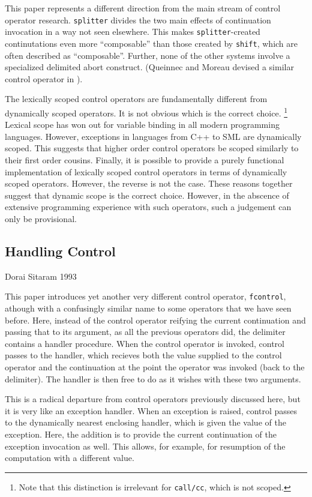 \documentclass[12pt]{article}
\begin{document}
This paper represents a different direction from the main stream of
control operator research.  {\tt splitter} divides the two main
effects of continuation invocation in a way not seen elsewhere.  This
makes {\tt splitter}-created continutations even more ``composable''
than those created by {\tt shift}, which are often described as
``composable''.  Further, none of the other systems involve a
specialized delimited abort construct.  (Queinnec and Moreau devised a
similar control operator in \cite{luc94partial}).  

The lexically scoped control operators are fundamentally different
from dynamically scoped operators.  It is not obvious which is the
correct choice.  \footnote{Note that this distinction is irrelevant
  for {\tt call/cc}, which is not scoped.}  Lexical scope has won out
for variable binding in all modern programming languages.  However,
exceptions in languages from C++ to SML are dynamically scoped.  This
suggests that higher order control operators be scoped similarly to
their first order cousins.  Finally, it is possible to provide a
purely functional implementation of lexically scoped control
operators in terms of dynamically scoped operators.  However, the
reverse is not the case.  These reasons together suggest that dynamic
scope is the correct choice.  However, in the abscence of extensive
programming experience with such operators, such a judgement can only
be provisional.  

\subsection*{Handling Control}
Dorai Sitaram 1993 \cite{sitaram93handling}

This paper introduces yet another very different control operator,
{\tt fcontrol}, athough with a confusingly similar name to some
operators that we have seen before. Here, instead of the control
operator reifying the current continuation and passing that to its
argument, as all the previous operators did, the delimiter contains a
handler procedure.  When the control operator is invoked, control
passes to the handler, which recieves both the value supplied to the
control operator and the continuation at the point the operator was
invoked (back to the delimiter).  The handler is then free to do as it
wishes with these two arguments.

This is a radical departure from control operators previously
discussed here, but it is very like an exception handler.  When an
exception is raised, control passes to the dynamically nearest
enclosing handler, which is given the value of the exception.  Here,
the addition is to provide the current continuation of the exception
invocation as well.  This allows, for example, for resumption of the
computation with a different value.  
\end{document}
